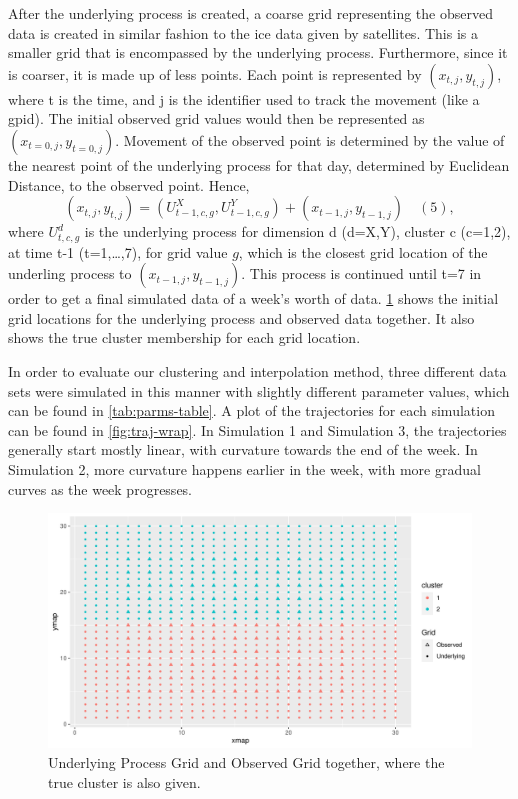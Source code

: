 \documentclass[12pt]{article}
\begin{document}
After the underlying process is created, a coarse grid representing the
observed data is created in similar fashion to the ice data given by
satellites. This is a smaller grid that is encompassed by the underlying
process. Furthermore, since it is coarser, it is made up of less points.
Each point is represented by \((x_{t,j}, y_{t,j})\), where t is the
time, and j is the identifier used to track the movement (like a gpid).
The initial observed grid values would then be represented as
\((x_{t=0,j}, y_{t=0,j})\). Movement of the observed point is determined
by the value of the nearest point of the underlying process for that
day, determined by Euclidean Distance, to the observed point. Hence,
\[(x_{t,j}, y_{t,j}) = (U^{X}_{t-1,c,g}, U^{Y}_{t-1,c,g}) + (x_{t-1,j}, y_{t-1,j}) \quad (5),\]
where \(U^d_{t,c,g}\) is the underlying process for dimension d (d=X,Y),
cluster c (c=1,2), at time t-1 (t=1,\ldots,7), for grid value \(g\),
which is the closest grid location of the underling process to
\((x_{t-1,j}, y_{t-1,j})\). This process is continued until t=7 in order
to get a final simulated data of a week's worth of data.
\cref{fig:grids-combined} shows the initial grid locations for the
underlying process and observed data together. It also shows the true
cluster membership for each grid location.

In order to evaluate our clustering and interpolation method, three
different data sets were simulated in this manner with slightly
different parameter values, which can be found in
\cref{tab:parms-table}. A plot of the trajectories for each simulation
can be found in \cref{fig:traj-wrap}. In Simulation 1 and Simulation 3,
the trajectories generally start mostly linear, with curvature towards
the end of the week. In Simulation 2, more curvature happens earlier in
the week, with more gradual curves as the week progresses.

\begin{figure}[tbp]

{\centering \includegraphics[width=\linewidth,]{spatio-temporal-model-arctic-sea-ice_files/figure-latex/grids-combined-1} 

}

\caption[Simulation Grids]{Underlying Process Grid and Observed Grid together, where the true cluster is also given.}\label{fig:grids-combined}
\end{figure}
\end{document}
